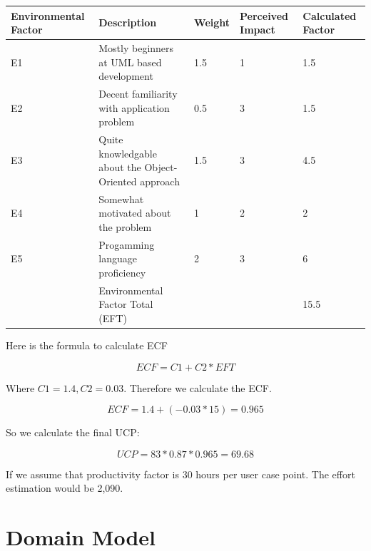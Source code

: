 \documentclass[letterpaper,english, 12pt]{scrreprt}
\begin{document}
\begin{center}
        \begin{tabular}{|C{3cm}|C{5cm}|C{1.5cm}|C{2cm}|C{2cm}|}
                \hline
                        Environmental Factor & Description & Weight & Perceived Impact & Calculated Factor \\
                \hline
                        E1 & Mostly beginners at UML based development & 1.5 & 1 & 1.5 \\
                \hline
                        E2 & Decent familiarity with application problem& 0.5 & 3 & 1.5\\
                \hline
                        E3 & Quite knowledgable about the Object-Oriented approach & 1.5 & 3 & 4.5 \\
                \hline
                        E4 & Somewhat motivated about the problem & 1 & 2 & 2 \\
                \hline
                        E5 & Progamming language proficiency & 2 & 3 & 6 \\
                \hline
                           & Environmental Factor Total (EFT) & & & 15.5 \\
                \hline
        \end{tabular}
\end{center}

Here is the formula to calculate ECF

\begin{equation}
ECF = C1 + C2 * EFT
\end{equation}

Where $C1 = 1.4, C2 = 0.03$.  Therefore we calculate the ECF.

\begin{equation}
ECF = 1.4 + (-0.03*15)=0.965
\end{equation}

So we calculate the final UCP:

\begin{equation}
UCP = 83*0.87*0.965 = 69.68
\end{equation}

If we assume that productivity factor is 30 hours per user case point. The effort estimation would be 2,090.

\chapter{Domain Model}
\end{document}

